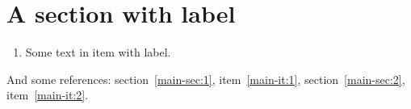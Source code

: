 \documentclass[../main]{subfiles}
\begin{document}
\section{A section with label}\label{sec:1}

\begin{enumerate}
\item Some text in item with label.\label{it:1}
\end{enumerate}
And some references: section~\ref{main-sec:1}, item~\ref{main-it:1}, section~\ref{main-sec:2}, item~\ref{main-it:2}.
\end{document}
